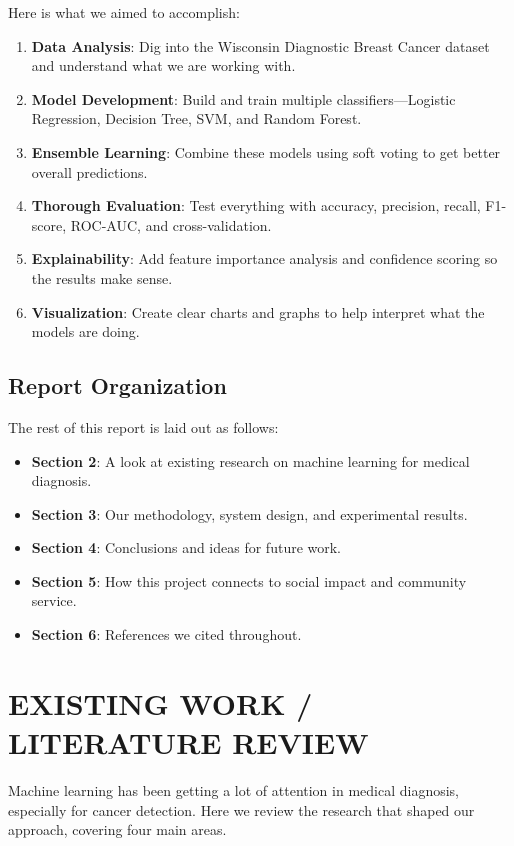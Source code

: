 \documentclass[12pt]{article}
\begin{document}
Here is what we aimed to accomplish:

\begin{enumerate}
    \item \textbf{Data Analysis}: Dig into the Wisconsin Diagnostic Breast Cancer dataset and understand what we are working with.
    \item \textbf{Model Development}: Build and train multiple classifiers---Logistic Regression, Decision Tree, SVM, and Random Forest.
    \item \textbf{Ensemble Learning}: Combine these models using soft voting to get better overall predictions.
    \item \textbf{Thorough Evaluation}: Test everything with accuracy, precision, recall, F1-score, ROC-AUC, and cross-validation.
    \item \textbf{Explainability}: Add feature importance analysis and confidence scoring so the results make sense.
    \item \textbf{Visualization}: Create clear charts and graphs to help interpret what the models are doing.
\end{enumerate}

\subsection{Report Organization}

The rest of this report is laid out as follows:
\begin{itemize}
    \item \textbf{Section 2}: A look at existing research on machine learning for medical diagnosis.
    \item \textbf{Section 3}: Our methodology, system design, and experimental results.
    \item \textbf{Section 4}: Conclusions and ideas for future work.
    \item \textbf{Section 5}: How this project connects to social impact and community service.
    \item \textbf{Section 6}: References we cited throughout.
\end{itemize}

\newpage
\section{EXISTING WORK / LITERATURE REVIEW}

Machine learning has been getting a lot of attention in medical diagnosis, especially for cancer detection. Here we review the research that shaped our approach, covering four main areas.
\end{document}
